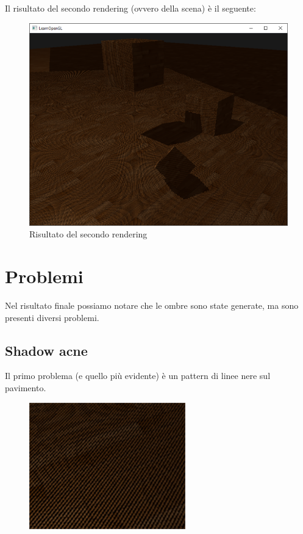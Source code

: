 \documentclass[12pt]{report}
\begin{document}
Il risultato del secondo rendering (ovvero della scena) è il seguente:

\begin{figure}[H]
    \centering
    \includegraphics[width=0.8\linewidth]{img/shadow_mapping_shadows.png}
    \caption{Risultato del secondo rendering}
\end{figure}

\chapter{Problemi}
Nel risultato finale possiamo notare che le ombre sono state generate, ma sono presenti diversi problemi.

\section{Shadow acne}
Il primo problema (e quello più evidente) è un pattern di linee nere sul pavimento. 

\begin{figure}[H]
    \centering
    \includegraphics[scale=0.5]{img/shadow_mapping_acne.png}
\end{figure}
\end{document}
